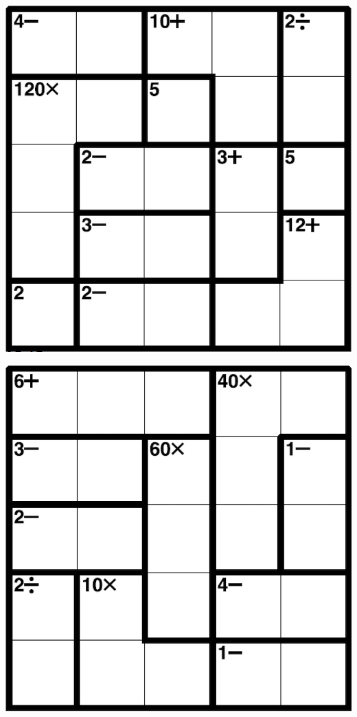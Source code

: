 
\includegraphics[scale=1]{Gambar/Lampiran/5x5_1.png}

\includegraphics[scale=1]{Gambar/Lampiran/5x5_2.png}
